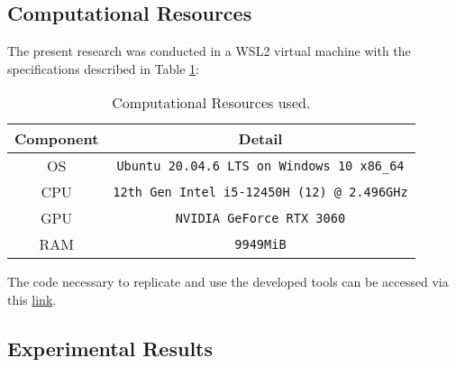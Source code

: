 \documentclass{IEEEtran}
\begin{document}
        \subsection{Computational Resources}
            The present research was conducted in a WSL2 virtual machine with the specifications described in Table \ref{tab:resources}:
            \begin{table}[!htbp]
                \centering
                \caption{Computational Resources used.}
                \label{tab:resources}
                \begin{tabular}{cc}
                    \toprule
                    Component & Detail \\
                    \midrule
                    OS & \texttt{Ubuntu 20.04.6 LTS on Windows 10 x86\_64} \\
                    CPU & \texttt{12th Gen Intel i5-12450H (12) @ 2.496GHz} \\
                    GPU & \texttt{NVIDIA GeForce RTX 3060} \\
                    RAM & \texttt{9949MiB} \\
                    \bottomrule
                \end{tabular}
            \end{table}

            The code necessary to replicate and use the developed tools can be accessed via this \href{https://github.com/JuanEcheagaray75/tec_research_predictive_maintenance}{link}.

        \subsection{Experimental Results}
\end{document}
